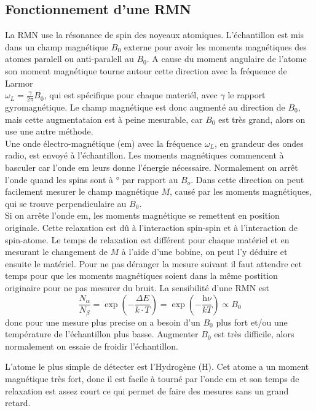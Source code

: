 \documentclass[a4paper,12pt]{scrartcl}
\begin{document}
  \subsection{Fonctionnement d'une RMN}
  La RMN use la résonance de spin des noyeaux atomiques. L'échantillon est mis dans un champ magnétique $B_0$ externe pour avoir les moments magnétiques des atomes paralell ou anti-paralell au $B_0$. A cause du moment angulaire de l'atome son moment magnétique tourne autour cette direction avec la fréquence de Larmor \\$\omega_L=\frac{\gamma}{2\pi}B_0$, qui est spécifique pour chaque materiél, avec $\gamma$ le rapport gyromagnétique. Le champ magnétique est donc augmenté au direction de $B_0$, mais cette augmentataion est à peine mesurable, car $B_0$ est très grand, alors on use une autre méthode.\\
  Une onde électro-magnétique (em) avec la fréquence $\omega_L$, en grandeur des ondes radio, est envoyé à l'échantillon. Les moments magnétiques commencent à basculer car l'onde em leurs donne l'énergie nécessaire. Normalement on arrêt l'onde quand les spins sont à \unit[90]{\degree} par rapport au $B_o$. Dans cette direction on peut facilement mesurer le champ magnétique $M$, causé par les moments magnétiques, qui se trouve perpendiculaire au $B_0$. \\
  Si on arrête l'onde em, les moments magnétique se remettent en position originale. Cette relaxation est dû à l'interaction spin-spin et à l'interaction de spin-atome. Le temps de relaxation est différent pour chaque matériel et en mesurant le changement de $M$ à l'aide d'une bobine, on peut l'y déduire et ensuite le matériel. Pour ne pas déranger la mesure suivant il faut attendre cet temps pour que les moments magnétiques soient dans la même postition originaire pour ne pas mesurer du bruit.  \newline
  La sensibilité d'une RMN est 
  \begin{equation*}
   \frac{N_{\alpha}}{N_{\beta}}=\exp\left(-\frac{\Delta E}{k\cdot T} \right)=\exp\left(-\frac{\text{h}\nu}{kT}\right)\propto B_0
  \end{equation*}
  donc pour une mesure plus precise on a besoin d'un $B_0$ plus fort et/ou une température de l'échantillon plus basse. Augmenter $B_0$ est très difficile, alors normalement on essaie de froidir l'échantillon. 

  L'atome le plus simple de détecter est l'Hydrogène (H). Cet atome a un moment magnétique très fort, donc il est facile à tourné par l'onde em et son temps de relaxation est assez court ce qui permet de faire des mesures sans un grand retard.
\end{document}
